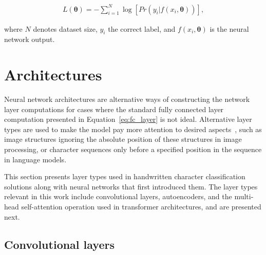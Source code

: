 \documentclass[english,twoside,openright]{UH_DS_MSc}
\begin{document}
\begin{align}
    L(\mathbf{\theta})=-\sum_{i=1}^{N}\log[Pr(y_i|f(x_i,\mathbf{\theta}))],
\end{align}

where $N$ denotes dataset size, $y_i$ the correct label, and $f(x_i, \mathbf{\theta})$ is the neural network output.


\section{Architectures}

Neural network architectures are alternative ways of constructing the 
network layer computations for cases where the standard 
fully connected layer computation presented in Equation~\ref{eq:fc_layer}
is not ideal. Alternative layer types are used to make the model pay more attention to desired 
aspects~\cite{alexnet}, such as image structures ignoring the absolute position of these structures in image processing, or 
character sequences only before a specified position in the sequence in language models.

This section presents layer types used in handwritten character classification 
solutions along with neural networks that first introduced them.
The layer types relevant in this work include convolutional layers, autoencoders, and the multi-head self-attention operation used in transformer 
architectures, and are presented next.

\subsection{Convolutional layers}
\end{document}
